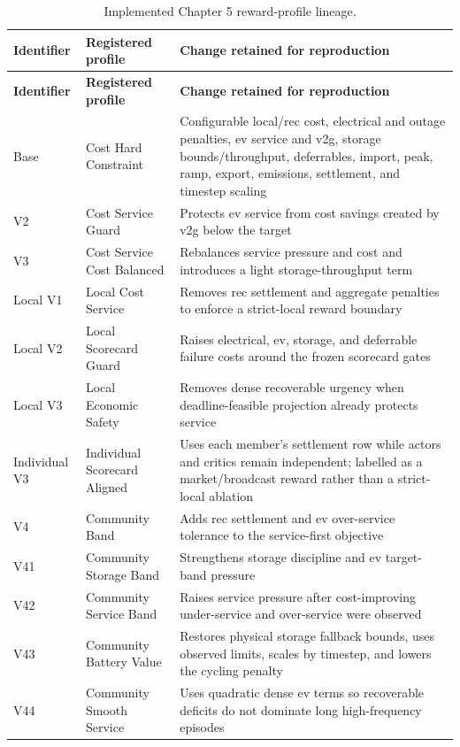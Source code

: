 \begin{longtable}{@{}p{}p{}p{}@{}}
\caption{Implemented Chapter 5 reward-profile lineage.}\label{tab:app-reward-profile-ledger}\\
\toprule
\textbf{Identifier} & \textbf{Registered profile} & \textbf{Change retained for reproduction} \\
\midrule
\endfirsthead
\toprule
\textbf{Identifier} & \textbf{Registered profile} & \textbf{Change retained for reproduction} \\
\midrule
\endhead
Base & Cost Hard Constraint & Configurable local/\gls{rec} cost, electrical and outage penalties, \gls{ev} service and \gls{v2g}, storage bounds/throughput, deferrables, import, peak, ramp, export, emissions, settlement, and timestep scaling \\
V2 & Cost Service Guard & Protects \gls{ev} service from cost savings created by \gls{v2g} below the target \\
V3 & Cost Service Cost Balanced & Rebalances service pressure and cost and introduces a light storage-throughput term \\
Local V1 & Local Cost Service & Removes \gls{rec} settlement and aggregate penalties to enforce a strict-local reward boundary \\
Local V2 & Local Scorecard Guard & Raises electrical, \gls{ev}, storage, and deferrable failure costs around the frozen scorecard gates \\
Local V3 & Local Economic Safety & Removes dense recoverable urgency when deadline-feasible projection already protects service \\
Individual V3 & Individual Scorecard Aligned & Uses each member's settlement row while actors and critics remain independent; labelled as a market/broadcast reward rather than a strict-local ablation \\
V4 & Community Band & Adds \gls{rec} settlement and \gls{ev} over-service tolerance to the service-first objective \\
V41 & Community Storage Band & Strengthens storage discipline and \gls{ev} target-band pressure \\
V42 & Community Service Band & Raises service pressure after cost-improving under-service and over-service were observed \\
V43 & Community Battery Value & Restores physical storage fallback bounds, uses observed limits, scales by timestep, and lowers the cycling penalty \\
V44 & Community Smooth Service & Uses quadratic dense \gls{ev} terms so recoverable deficits do not dominate long high-frequency episodes \\

\end{longtable}
